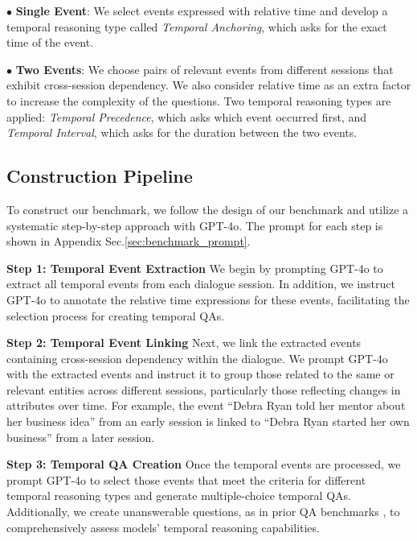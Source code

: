 $\bullet$ \textbf{Single Event}: We select events expressed with relative time and develop a temporal reasoning type called \textit{Temporal Anchoring}, which asks for the exact time of the event.

$\bullet$ \textbf{Two Events}: We choose pairs of relevant events from different sessions that exhibit cross-session dependency. We also consider relative time as an extra factor to increase the complexity of the questions. Two temporal reasoning types are applied: \textit{Temporal Precedence}, which asks which event occurred first, and \textit{Temporal Interval}, which asks for the duration between the two events.

\subsection{Construction Pipeline}
To construct our benchmark, we follow the design of our benchmark and utilize a systematic step-by-step approach with GPT-4o. 
The prompt for each step is shown in Appendix Sec.\ref{sec:benchmark_prompt}.

\noindent \textbf{Step 1: Temporal Event Extraction}
We begin by prompting GPT-4o to extract all temporal events from each dialogue session. In addition, we instruct GPT-4o to annotate the relative time expressions for these events, facilitating the selection process for creating temporal QAs.

\noindent \textbf{Step 2: Temporal Event Linking}
Next, we link the extracted events containing cross-session dependency within the dialogue. We prompt GPT-4o with the extracted events and instruct it to group those related to the same or relevant entities across different sessions, particularly those reflecting changes in attributes over time. For example, the event “Debra Ryan told her mentor about her business idea” from an early session is linked to “Debra Ryan started her own business” from a later session.

\noindent \textbf{Step 3: Temporal QA Creation}
Once the temporal events are processed, we prompt GPT-4o to select those events that meet the criteria for different temporal reasoning types and generate multiple-choice temporal QAs. Additionally, we create unanswerable questions, as in prior QA benchmarks \cite{rajpurkar2018know}, to comprehensively assess models' temporal reasoning capabilities.

